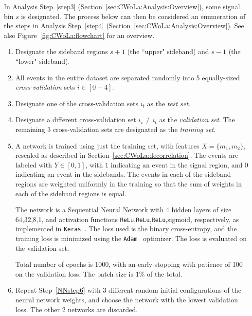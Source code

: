 In Analysis Step~\ref{step3} (Section~\ref{sec:CWoLa:Analysis:Overview}), some signal bin $s$ is designated. The process below can then be considered an enumeration of the steps in Analysis Step~\ref{step4} (Section~\ref{sec:CWoLa:Analysis:Overview}).
See also Figure~\ref{fig:CWoLa:flowchart} for an overview. 

\begin{enumerate}
  \item Designate the sideband regions $s+1$ (the ``upper" sideband) and $s-1$ (the ``lower" sideband). 
  \label{NNstep2}
  \item All events in the entire dataset are separated randomly into 5 equally-sized \textit{cross-validation} sets $i \in [0-4]$.
  \label{NNstep1}
  \item Designate one of the cross-validation sets $i_t$ as the \textit{test set}.
  \label{NNstep3}
  \item Designate a different cross-validation set $i_v \ne i_t$ as the \textit{validation set}. The remaining 3 cross-validation sets are designated as the \textit{training set}.
  \label{NNstep5}
  \item A network is trained using just the training set, with features $X = \{m_1,m_2\}$, rescaled as described in Section~\ref{sec:CWoLa:decorrelation}. The events are labeled with $Y \in [0,1]$, with $1$ indicating an event in the signal region, and $0$ indicating an event in the sidebands. The events in each of the sideband regions are weighted uniformly in the training so that the sum of weights in each of the sideband regions is equal.

  The network is a Sequential Neural Network with 4 hidden layers of size 64,32,8,1, and activation functions \texttt{ReLu},\texttt{ReLu},\texttt{ReLu},sigmoid, respectively, as implemented in \texttt{Keras}~\cite{chollet2015keras}.
  The loss used is the binary cross-entropy, and the training loss is minimized using the \texttt{Adam}~\cite{kingma2014adam} optimizer.
  The loss is evaluated on the validation set.
  
  Total number of epochs is 1000, with an early stopping with patience of 100 on the validation loss. The batch size is 1\% of the total.

  
  \label{NNstep6}
  \item Repeat Step~\ref{NNstep6} with 3 different random initial configurations of the neural network weights, and choose the network with the lowest validation loss. The other 2 networks are discarded.
  \label{NNstep7}


\end{enumerate}

